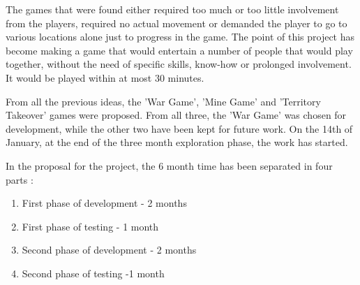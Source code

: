 \documentclass{article}
\begin{document}
The games that were found either required too much or too little involvement
from the players, required no actual movement or demanded the player to go to various
locations alone just to progress in the game. The point of this project has
become making a game that would entertain a number of people that would play
together, without the need of specific skills, know-how or prolonged
involvement. It would be played within at most 30 minutes.\newline

From all the previous ideas, the 'War Game', 'Mine Game' and 'Territory
Takeover' games were proposed. From all three, the 'War Game' was chosen for
development, while the other two have been kept for future work. On the 14th of
January, at the end of the three month exploration phase, the work has
started.\newline

In the proposal for the project, the 6 month time has been separated in four
parts :
\begin{enumerate}
  \item First phase of development - 2 months
  \item First phase of testing - 1 month
  \item Second phase of development - 2 months
  \item Second phase of testing -1 month  
\end{enumerate}
\end{document}
